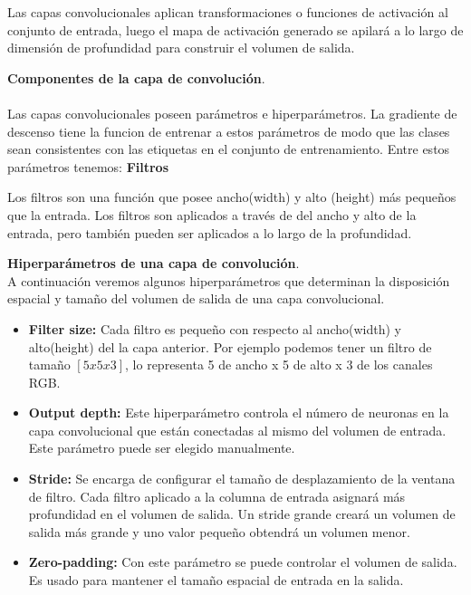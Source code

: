 Las capas convolucionales aplican transformaciones o funciones de activación al conjunto de entrada, luego el mapa de activación generado se apilará a lo largo de dimensión de profundidad para construir el volumen de salida.

\textbf{Componentes de la capa de convolución}.\\	\\
Las capas convolucionales poseen parámetros e hiperparámetros. La gradiente de descenso tiene la funcion de entrenar a estos parámetros de modo que las clases sean consistentes con las etiquetas en el conjunto de entrenamiento. Entre estos parámetros tenemos:
\textbf{Filtros}

Los filtros son una función que posee ancho(width) y alto (height) más pequeños que la entrada. Los filtros son aplicados a través de  del ancho y alto de la entrada, pero también pueden ser aplicados a lo largo de la profundidad.

\vspace{5cm}
\textbf{Hiperparámetros de una capa de convolución}.\\
A continuación veremos algunos hiperparámetros que determinan la disposición espacial y tamaño del volumen de salida de una capa convolucional.
\begin{itemize}
	\item \textbf{Filter size:} Cada filtro es pequeño con respecto al ancho(width) y alto(height) del la capa anterior. Por ejemplo podemos tener un filtro de tamaño $[5x5x3]$, lo representa 5 de ancho x 5 de alto x 3 de los canales RGB.
	\item \textbf{Output depth:} Este hiperparámetro controla el número de neuronas en la capa convolucional que están conectadas al mismo del volumen de entrada. Este parámetro puede ser elegido manualmente.
	\item \textbf{Stride:} Se encarga de configurar el tamaño de desplazamiento de la ventana de filtro. Cada filtro aplicado a la columna de entrada asignará más profundidad en el volumen de salida. Un stride grande creará un volumen de salida más grande y uno valor pequeño obtendrá un volumen menor.
	\item \textbf{Zero-padding:} Con este parámetro se puede controlar el volumen de salida. Es usado para mantener el tamaño espacial de entrada en la salida. 
\end{itemize}

